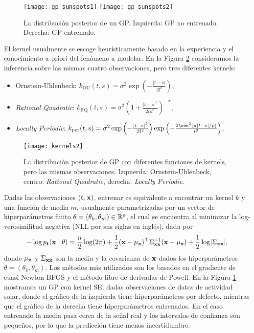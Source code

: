 \begin{figure}[h]
	\centering
	\texttt{[image: gp\_sunspots1]}
	\texttt{[image: gp\_sunspots2]}
	\caption{La distribución posterior de un GP. Izquierda: GP no entrenado. Derecha: GP entrenado.}
	\label{fig:gp_sunspots_example}
\end{figure}

El kernel usualmente se escoge heurísticamente basado en la experiencia y el conocimiento a priori del fenómeno a modelar. En la Figura \ref{fig:gp_kernels} consideramos la inferencia sobre las mismas cuatro observaciones, pero tres diferentes kernels:
\begin{itemize}
	\item Ornstein-Uhlenbeck: \(k_{\mathrm{OU}}(t, s) = \sigma^2 \exp\left(-\frac{\lvert t-s \rvert}{2l^2}\right)\),
	\item \emph{Rational Quadratic}: \(k_{\mathrm{RQ}}(t, s) = \sigma^2 \left(1 + \frac{\lvert t - s \rvert^2}{2\alpha l^2}\right)^{-\alpha}\),
	\item \emph{Locally Periodic}: \(k_{\mathrm{per}}(t, s) = \sigma^2 \exp\left(-\frac{\lvert t - s \rvert^2}{2l^2}\right) \exp\left(-\frac{2\sen^2 (\pi \lvert t - s \rvert/p)}{l^2}\right)\).
\end{itemize}
\begin{figure}[h]
	\centering
	\texttt{[image: kernels2]}
	\caption{La distribución posterior de GP con diferentes funciones de kernels, pero las mismas observaciones. Izquierda: Ornstein-Uhlenbeck, centro: \emph{Rational Quadratic}, derecha: \emph{Locally Periodic}.}
	\label{fig:gp_kernels}
\end{figure}

Dadas las observaciones \((\mathbf{t},\mathbf{x})\), entrenar es equivalente a encontrar un kernel \(k\) y una función de media \(m\), usualmente parametrizadas por un vector de hiperparámetros finito \(\theta = (\theta_k, \theta_m) \in \mathbb{R}^p\), el cual se encuentra al minimizar la log-verosimilitud negativa (NLL por sus siglas en inglés), dada por
\[-\log p_{\mathbf{t}}(\mathbf{x} \mid \theta) = \frac{n}{2} \log(2\pi) + \frac{1}{2} (\mathbf{x} - \mu_{\mathbf{x}} )^\top \Sigma_{\mathbf{x} \mathbf{x}}^{-1} (\mathbf{x} - \mu_{\mathbf{x}}) + \frac{1}{2} \log \lvert \Sigma_{\mathbf{x} \mathbf{x}} \rvert,\]
donde \(\mu_{\mathbf{x}}\) y \(\Sigma_{\mathbf{x} \mathbf{x}}\) son la media y la covarianza de \(\mathbf{x}\) dados los hiperparámetros \(\theta = (\theta_k, \theta_m)\). Los métodos más utilizados son los basados en el gradiente de cuasi-Newton BFGS y el método libre de derivadas de Powell. En la Figura \ref{fig:gp_sunspots_example} mostramos un GP con kernel SE, dadas observaciones de datos de actividad solar, donde el gráfico de la izquierda tiene hiperparámetros por defecto, mientras que el gráfico de la derecha tiene hiperparámetros entrenados. En el caso entrenado la media pasa cerca de la señal real y los intervalos de confianza son pequeños, por lo que la predicción tiene menos incertidumbre.

